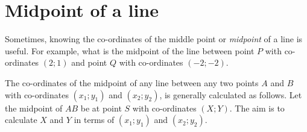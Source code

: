             \section{ Midpoint of a line}
            \nopagebreak
\label{m39119*id68364}Sometimes, knowing the co-ordinates of the middle point or \textsl{midpoint} of a line is useful. For example, what is the midpoint of the line between point \begin{math}P\end{math} with co-ordinates \begin{math}\left(2;1\right)\end{math} and point \begin{math}Q\end{math} with co-ordinates \begin{math}\left(-2;-2\right)\end{math}.\par 
        \label{m39119*id68433}The co-ordinates of the midpoint of any line between any two points \begin{math}A\end{math} and \begin{math}B\end{math} with co-ordinates \begin{math}\left({x}_{1};{y}_{1}\right)\end{math} and \begin{math}\left({x}_{2};{y}_{2}\right)\end{math}, is generally calculated as follows. Let the midpoint of \begin{math}AB\end{math} be at point \begin{math}S\end{math} with co-ordinates \begin{math}\left(X;Y\right)\end{math}. The aim is to calculate \begin{math}X\end{math} and \begin{math}Y\end{math} in terms of \begin{math}\left({x}_{1};{y}_{1}\right)\end{math} and \begin{math}\left({x}_{2};{y}_{2}\right)\end{math}.\par 
    \setcounter{subfigure}{0}
